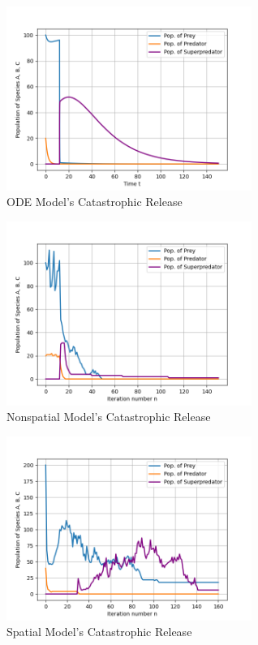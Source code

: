 \documentclass[journal]{IEEEtran}
\begin{document}
\begin{figure}[h]
    \vspace{-4mm}
    \centering
    \includegraphics[width=8cm]{images/catastrophic_release_ode.png}
    \vspace{-8mm}
    \caption{ODE Model's Catastrophic Release}
    \label{fig:catastrophic_release_ode}
\end{figure}
\begin{figure}[h]
    \vspace{-5mm}
    \centering
    \includegraphics[width=8cm]{images/catastrophic_release_nonspatial.png}
    \vspace{-8mm}
    \caption{Nonspatial Model's Catastrophic Release}
    \label{fig:catastrophic_release_nonspatial}
\end{figure}
\begin{figure}[h]
    \vspace{-5mm}
    \centering
    \includegraphics[width=8cm]{images/catastrophic_release_spatial.png}
    \vspace{-8mm}
    \caption{Spatial Model's Catastrophic Release}
    \label{fig:catastrophic_release_spatial}
\end{figure}
\end{document}
